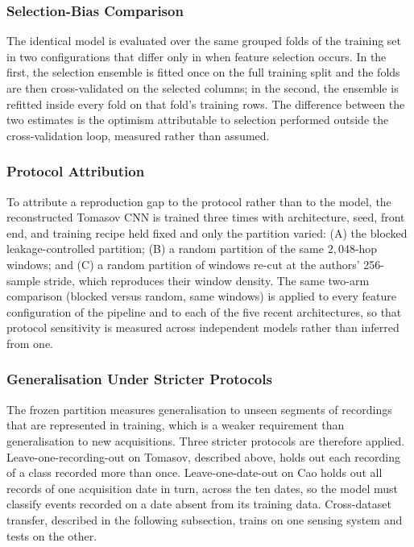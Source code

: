 \subsubsection{Selection-Bias Comparison}
\label{sec:chap3SelectionBias}
The identical model is evaluated over the same grouped folds of the training set in two configurations that differ only in when feature selection occurs. In the first, the selection ensemble is fitted once on the full training split and the folds are then cross-validated on the selected columns; in the second, the ensemble is refitted inside every fold on that fold's training rows. The difference between the two estimates is the optimism attributable to selection performed outside the cross-validation loop, measured rather than assumed.

\subsubsection{Protocol Attribution}
\label{sec:chap3ProtocolAttribution}
To attribute a reproduction gap to the protocol rather than to the model, the reconstructed Tomasov CNN is trained three times with architecture, seed, front end, and training recipe held fixed and only the partition varied: (A) the blocked leakage-controlled partition; (B) a random partition of the same $2{,}048$-hop windows; and (C) a random partition of windows re-cut at the authors' 256-sample stride, which reproduces their window density. The same two-arm comparison (blocked versus random, same windows) is applied to every feature configuration of the pipeline and to each of the five recent architectures, so that protocol sensitivity is measured across independent models rather than inferred from one.

\subsubsection{Generalisation Under Stricter Protocols}
\label{sec:chap3StricterProtocols}
The frozen partition measures generalisation to unseen segments of recordings that are represented in training, which is a weaker requirement than generalisation to new acquisitions. Three stricter protocols are therefore applied. Leave-one-recording-out on Tomasov, described above, holds out each recording of a class recorded more than once. Leave-one-date-out on Cao holds out all records of one acquisition date in turn, across the ten dates, so the model must classify events recorded on a date absent from its training data. Cross-dataset transfer, described in the following subsection, trains on one sensing system and tests on the other.

